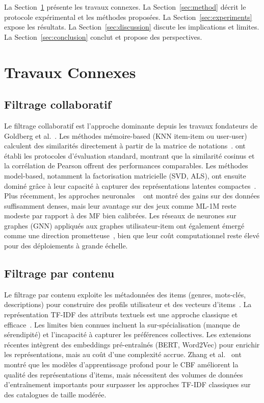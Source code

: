 \documentclass[conference]{IEEEtran}
\begin{document}
La Section~\ref{sec:related} présente les travaux connexes.
La Section~\ref{sec:method} décrit le protocole expérimental et les méthodes
proposées. La Section~\ref{sec:experiments} expose les résultats.
La Section~\ref{sec:discussion} discute les implications et limites.
La Section~\ref{sec:conclusion} conclut et propose des perspectives.



\section{Travaux Connexes}
\label{sec:related}

\subsection{Filtrage collaboratif}

Le filtrage collaboratif est l'approche dominante depuis les travaux fondateurs
de Goldberg et al.~\cite{goldberg1992}. Les méthodes mémoire-based (KNN
item-item ou user-user) calculent des similarités directement à partir de la
matrice de notations~\cite{sarwar2001}. \cite{herlocker2004} ont établi les
protocoles d'évaluation standard, montrant que la similarité cosinus et la
corrélation de Pearson offrent des performances comparables. Les méthodes
model-based, notamment la factorisation matricielle (SVD, ALS), ont ensuite
dominé grâce à leur capacité à capturer des représentations latentes
compactes~\cite{koren2009}. Plus récemment, les approches neuronales
~\cite{he2017,sun2019} ont montré des gains sur des données suffisamment
denses, mais leur avantage sur des jeux comme ML-1M reste modeste par rapport
à des MF bien calibrées. Les réseaux de neurones sur graphes (GNN) appliqués
aux graphes utilisateur-item ont également émergé comme une direction
prometteuse~\cite{gao2023}, bien que leur coût computationnel reste élevé
pour des déploiements à grande échelle.

\subsection{Filtrage par contenu}

Le filtrage par contenu exploite les métadonnées des items (genres, mots-clés,
descriptions) pour construire des profils utilisateur et des vecteurs
d'items~\cite{pazzani2007}. La représentation TF-IDF des attributs textuels
est une approche classique et efficace~\cite{salton1983}. Les limites bien
connues incluent la sur-spécialisation (manque de sérendipité) et l'incapacité
à capturer les préférences collectives. Les extensions récentes intègrent des
embeddings pré-entraînés (BERT, Word2Vec) pour enrichir les représentations,
mais au coût d'une complexité accrue. Zhang et al.~\cite{zhang2019} ont montré
que les modèles d'apprentissage profond pour le CBF améliorent la qualité
des représentations d'items, mais nécessitent des volumes de données
d'entraînement importants pour surpasser les approches TF-IDF classiques
sur des catalogues de taille modérée.
\end{document}
